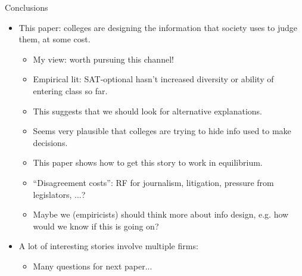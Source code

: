 \documentclass[11pt, aspectratio=169]{beamer}
\theoremstyle{plain}
\theoremstyle{plain}
\theoremstyle{plain}
\theoremstyle{plain}
\begin{document}
\begin{frame}{Conclusions}
    \begin{itemize}
        \item This paper: colleges are designing the information that society uses to judge them, at some cost. \pause
        \begin{itemize}
            \item My view: worth pursuing this channel!
            \item Empirical lit: SAT-optional hasn't increased diversity or ability of entering class so far.
            \item This suggests that we should look for alternative explanations.  \pause
            \item Seems very plausible that colleges are trying to hide info used to make decisions. \pause
            \item This paper shows how to get this story to work in equilibrium. \pause 
            \item ``Disagreement costs'': RF for journalism, litigation, pressure from legislators, ...? \pause 
            \item Maybe we (empiricists) should think more about info design, e.g. how would we know if this is going on? \pause
        \end{itemize}
        \item A lot of interesting stories involve multiple firms:
        \begin{itemize}
            \item Many questions for next paper...
        \end{itemize}
    \end{itemize}
\end{frame}
\end{document}
